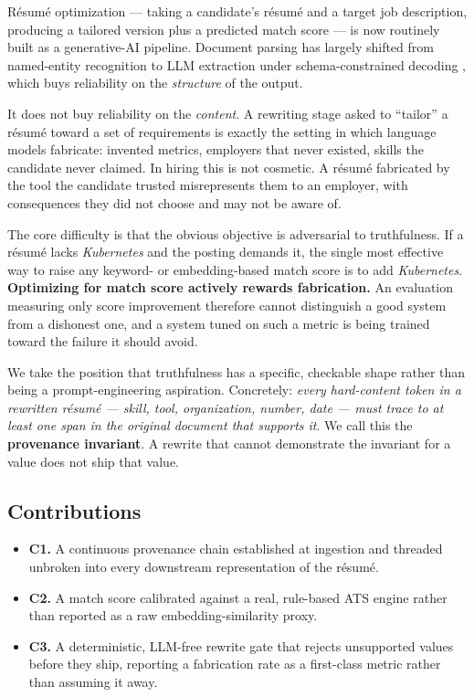 \documentclass[conference]{IEEEtran}
\begin{document}
Résumé optimization --- taking a candidate's résumé and a target job
description, producing a tailored version plus a predicted match score --- is
now routinely built as a generative-AI pipeline. Document parsing has largely
shifted from named-entity recognition to LLM extraction under
schema-constrained decoding \cite{docling,outlines,vllm}, which buys reliability
on the \emph{structure} of the output.

It does not buy reliability on the \emph{content}. A rewriting stage asked to
``tailor'' a résumé toward a set of requirements is exactly the setting in which
language models fabricate: invented metrics, employers that never existed,
skills the candidate never claimed. In hiring this is not cosmetic. A résumé
fabricated by the tool the candidate trusted misrepresents them to an employer,
with consequences they did not choose and may not be aware of.

The core difficulty is that the obvious objective is adversarial to
truthfulness. If a résumé lacks \emph{Kubernetes} and the posting demands it,
the single most effective way to raise any keyword- or embedding-based match
score is to add \emph{Kubernetes}. \textbf{Optimizing for match score actively
rewards fabrication.} An evaluation measuring only score improvement therefore
cannot distinguish a good system from a dishonest one, and a system tuned on
such a metric is being trained toward the failure it should avoid.

We take the position that truthfulness has a specific, checkable shape rather
than being a prompt-engineering aspiration. Concretely: \emph{every hard-content
token in a rewritten résumé --- skill, tool, organization, number, date --- must
trace to at least one span in the original document that supports it}. We call
this the \textbf{provenance invariant}. A rewrite that cannot demonstrate the
invariant for a value does not ship that value.

\subsection{Contributions}
\begin{itemize}
  \item \textbf{C1.} A continuous provenance chain established at ingestion and
    threaded unbroken into every downstream representation of the résumé.
  \item \textbf{C2.} A match score calibrated against a real, rule-based ATS
    engine rather than reported as a raw embedding-similarity proxy.
  \item \textbf{C3.} A deterministic, LLM-free rewrite gate that rejects
    unsupported values before they ship, reporting a fabrication rate as a
    first-class metric rather than assuming it away.
\end{itemize}
\end{document}
